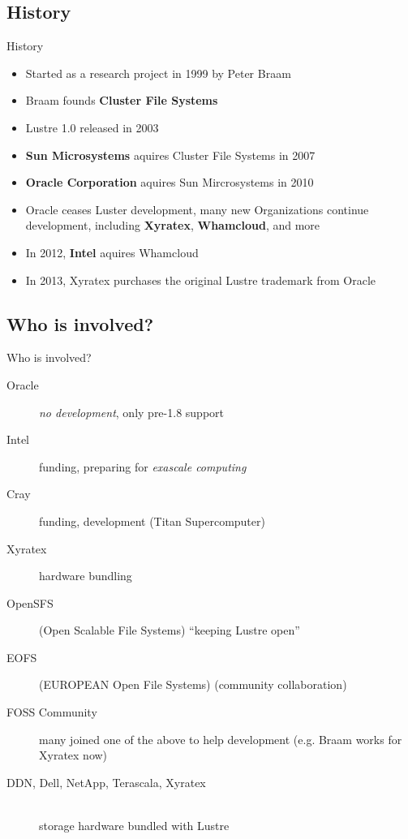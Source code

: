 \subsection{History}
\begin{frame}{History}
    \begin{itemize}
        \item Started as a research project in 1999 by Peter Braam
        \item Braam founds \textbf{Cluster File Systems}
        \item Lustre 1.0 released in 2003
        \item \textbf{Sun Microsystems} aquires Cluster File Systems in 2007
        \item \textbf{Oracle Corporation} aquires Sun Mircrosystems in 2010
        \item Oracle ceases Luster development, many new Organizations continue
            development, including \textbf{Xyratex},  \textbf{Whamcloud}, and
            more
        \item In 2012, \textbf{Intel} aquires Whamcloud
        \item In 2013, Xyratex purchases the original Lustre trademark from Oracle
    \end{itemize}
\end{frame}

\subsection{Who is involved?}
\begin{frame}{Who is involved?}
    \begin{description}
        \item[Oracle] \emph{no development}, only pre-1.8 support
        \item[Intel] funding, preparing for \emph{exascale computing}
        \item[Cray] funding, development (Titan Supercomputer)
        \item[Xyratex] hardware bundling
        \item[OpenSFS] (Open Scalable File Systems) ``keeping Lustre open''
        \item[EOFS] (EUROPEAN Open File Systems) (community collaboration)
        \item[FOSS Community] many joined one of the above to help development
            (e.g. Braam works for Xyratex now)
        \item[DDN, Dell, NetApp, Terascala, Xyratex]\hfill \\
            storage hardware bundled with Lustre
    \end{description}
\end{frame}


